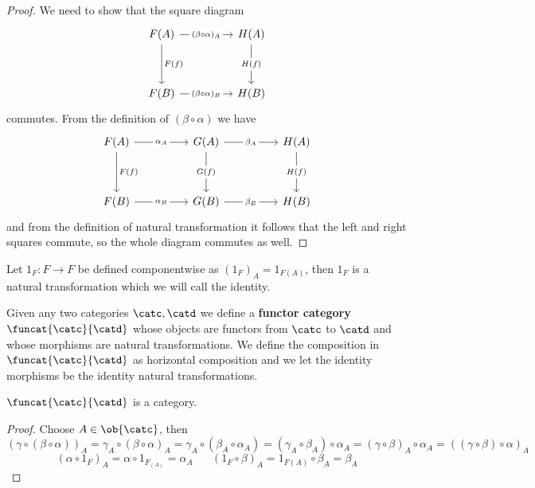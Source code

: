 \begin{proof}[Proof]
    We need to show that the square diagram
\[\begin{tikzcd}
	{F(A)} && {H(A)} \\
	\\
	{F(B)} && {H(B)}
	\arrow["{(\beta\circ\alpha)_A}"{description}, from=1-1, to=1-3]
	\arrow["{F(f)}", from=1-1, to=3-1]
	\arrow["{H(f)}"{description}, from=1-3, to=3-3]
	\arrow["{(\beta\circ\alpha)_B}"{description}, from=3-1, to=3-3]
\end{tikzcd}\]
    commutes. From the definition of $(\beta\circ\alpha)$ we have
    \[\begin{tikzcd}
	{F(A)} && {G(A)} && {H(A)} \\
	\\
	{F(B)} && {G(B)} && {H(B)}
	\arrow["{\alpha_A}"{description}, from=1-1, to=1-3]
	\arrow["{F(f)}", from=1-1, to=3-1]
	\arrow["{\beta_A}"{description}, from=1-3, to=1-5]
	\arrow["{G(f)}"{description}, from=1-3, to=3-3]
	\arrow["{H(f)}"{description}, from=1-5, to=3-5]
	\arrow["{\alpha_B}"{description}, from=3-1, to=3-3]
	\arrow["{\beta_B}"{description}, from=3-3, to=3-5]
\end{tikzcd}\]
    and from the definition of natural transformation it follows that the left and right squares
    commute, so the whole diagram commutes as well.
\end{proof}
\begin{definition}
    Let $1_F : F\to F$ be defined componentwise as $(1_F)_A = 1_{F(A)}$, then $1_F$
    is a natural transformation which we will call the identity.
\end{definition}
\begin{definition}
    Given any two categories $\catc,\catd$ we define a \textbf{functor category} $\funcat{\catc}{\catd}$
    whose objects are functors from $\catc$ to $\catd$ and whose morphisms are
    natural transformations. We define the composition in $\funcat{\catc}{\catd}$ as horizontal
    composition and we let the identity morphisms be the identity natural transformations.
\end{definition}
\begin{proposition}
    $\funcat{\catc}{\catd}$ is a category.
\end{proposition}
\begin{proof}[Proof]
    Choose $A\in\ob{\catc}$, then 
    \begin{equation*}
        (\gamma\circ(\beta\circ\alpha))_A = \gamma_A\circ(\beta\circ\alpha)_A
        = \gamma_A\circ(\beta_A\circ\alpha_A) = (\gamma_A\circ\beta_A)\circ\alpha_A = 
        (\gamma\circ\beta)_A\circ\alpha_A = ((\gamma\circ\beta)\circ\alpha)_A
    \end{equation*}
    \begin{equation*}
        (\alpha\circ 1_F)_A = \alpha \circ 1_{F_(A)} = \alpha_A \hspace{20pt} 
        (1_F\circ\beta)_A = 1_{F(A)}\circ\beta_A = \beta_A
    \end{equation*}
\end{proof}
